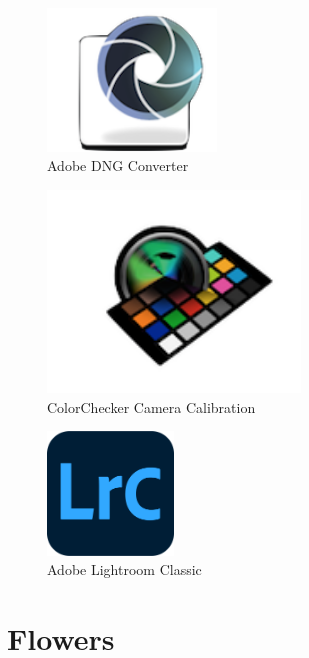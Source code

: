 \documentclass[
]{book}
\theoremstyle{definition}
\theoremstyle{definition}
\theoremstyle{definition}
\theoremstyle{definition}
\theoremstyle{remark}
\begin{document}
\begin{figure}
\centering
\includegraphics[width=0.4\textwidth,height=\textheight]{Figures/logo Adobe DNG Converter.png}
\caption{Adobe DNG
Converter}
\end{figure}

\begin{figure}
\centering
\includegraphics[width=0.6\textwidth,height=\textheight]{Figures/logo ColorChecker Camera Calibration.png}
\caption{ColorChecker Camera
Calibration}
\end{figure}

\begin{figure}
\centering
\includegraphics[width=0.3\textwidth,height=\textheight]{Figures/logo Lrc.png}
\caption{Adobe Lightroom Classic}
\end{figure}

\hypertarget{flowers}{%
\section{Flowers}\label{flowers}}
\end{document}
